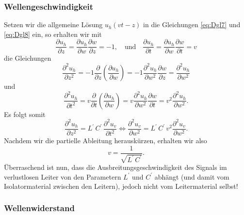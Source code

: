 \documentclass[paper=a4, parskip=half-, ngerman, fontsize=11pt]{scrreprt}
\begin{document}
\subsubsection{Wellengeschwindigkeit}

Setzen wir die allgemeine Lösung $u_{h}(v t - z)$ in die Gleichungen \eqref{eq:Dgl7} und \eqref{eq:Dgl8} ein, so
erhalten wir mit
\begin{equation*}
    \frac{\partial u_{h}}{\partial z} = \frac{\partial u_{h}}{\partial w} \frac{\partial w}{\partial z} = -1,
    \quad \text{und} \quad
    \frac{\partial u_{h}}{\partial t} = \frac{\partial u_{h}}{\partial w} \frac{\partial w}{\partial t} = v
\end{equation*}
die Gleichungen
\begin{equation*}
    \frac{\partial^{2} u_{h}}{\partial z^{2}} = -1 \frac{\partial}{\partial z} \left( \frac{\partial u_{h}}{\partial w}
    \right) = -1 \frac{\partial^{2} u_{h}}{\partial w^{2}} \frac{\partial w}{\partial z} = \frac{\partial^{2}
    u_{h}}{\partial w^{2}}
\end{equation*}
und
\begin{equation*}
    \frac{\partial^{2} u_{h}}{\partial t^{2}} = v \frac{\partial}{\partial t} \left( \frac{\partial u_{h}}{\partial w}
    \right) = v \frac{\partial^{2} u_{h}}{\partial w^{2}} \frac{\partial w}{\partial t} =v^{2} \frac{\partial^{2}
        u_{h}}{\partial w^{2}}.
\end{equation*}
Es folgt somit
\begin{equation*}
    \frac{\partial^{2} u_{h}}{\partial z^{2}} = L^{\prime} \, C^{\prime} \, \frac{\partial^{2} u_{v}}{\partial t^{2}}
    \Leftrightarrow
    \frac{\partial^{2} u_{v}}{\partial w^{2}} = L^{\prime} \, C^{\prime} \, v^{2} \frac{\partial^{2} u_{v}}{\partial
    w^{2}}.
\end{equation*}
Nachdem wir die partielle Ableitung herauskürzen, erhalten wir also
\begin{equation}
    v = \frac{1}{\sqrt{L^{\prime} \, C^{\prime}}} \label{eq:WellenGeschw1}.
\end{equation}
Überraschend ist nun, dass die Ausbreitungsgeschwindigkeit des Signals im verlustlosen Leiter von den Parametern
$L^{\prime}$ und $C^{\prime}$ abhängt (und damit vom Isolatormaterial zwischen den Leitern), jedoch nicht vom
Leitermaterial selbst!


\subsubsection{Wellenwiderstand}
\end{document}
